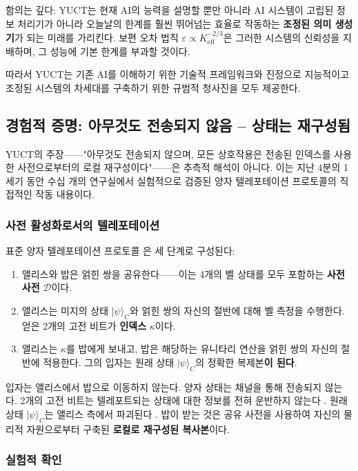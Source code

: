 \documentclass[12pt,a4paper]{article}
\begin{document}
	함의는 깊다: YUCT는 현재 AI의 능력을 설명할 뿐만 아니라 AI 시스템이 고립된 정보 처리기가 아니라 오늘날의 한계를 훨씬 뛰어넘는 효율로 작동하는 \textbf{조정된 의미 생성기}가 되는 미래를 가리킨다. 보편 오차 법칙 $\varepsilon \propto K_{\mathrm{eff}}^{-2/3}$은 그러한 시스템의 신뢰성을 지배하며, 그 성능에 기본 한계를 부과할 것이다.
	
	따라서 YUCT는 기존 AI를 이해하기 위한 기술적 프레임워크와 진정으로 지능적이고 조정된 시스템의 차세대를 구축하기 위한 규범적 청사진을 모두 제공한다.
	
	\subsection{경험적 증명: 아무것도 전송되지 않음 – 상태는 재구성됨}
	
	YUCT의 주장——"아무것도 전송되지 않으며, 모든 상호작용은 전송된 인덱스를 사용한 사전으로부터의 로컬 재구성이다"——은 추측적 해석이 아니다. 이는 지난 4분의 1세기 동안 수십 개의 연구실에서 실험적으로 검증된 양자 텔레포테이션 프로토콜의 직접적인 작동 내용이다.
	
	\subsubsection{사전 활성화로서의 텔레포테이션}
	
	표준 양자 텔레포테이션 프로토콜 \cite{Bennett1993}은 세 단계로 구성된다:
	\begin{enumerate}
		\item 앨리스와 밥은 얽힌 쌍을 공유한다——이는 4개의 벨 상태를 모두 포함하는 \textbf{사전 사전} $\mathcal{D}$이다.
		\item 앨리스는 미지의 상태 $|\psi\rangle_C$와 얽힌 쌍의 자신의 절반에 대해 벨 측정을 수행한다. 얻은 2개의 고전 비트가 \textbf{인덱스} $\kappa$이다.
		\item 앨리스는 $\kappa$를 밥에게 보내고, 밥은 해당하는 유니타리 연산을 얽힌 쌍의 자신의 절반에 적용한다. 그의 입자는 원래 상태 $|\psi\rangle_C$의 정확한 복제본\textbf{이 된다}.
	\end{enumerate}
	
	입자는 앨리스에서 밥으로 이동하지 않는다. 양자 상태는 채널을 통해 전송되지 않는다. 2개의 고전 비트는 텔레포트되는 상태에 대한 정보를 전혀 운반하지 않는다 \cite{Pirandola2017}. 원래 상태 $|\psi\rangle_C$는 앨리스 측에서 파괴된다 \cite{Wootters1982}. 밥이 받는 것은 공유 사전을 사용하여 자신의 물리적 자원으로부터 구축된 \textbf{로컬로 재구성된 복사본}이다.
	
	\subsubsection{실험적 확인}
	
\end{document}
